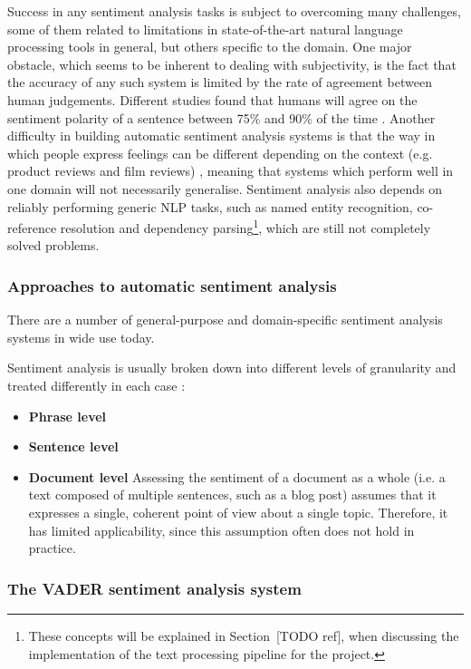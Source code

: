 \documentclass[bsc,frontabs,singlespacing,parskip, twoside]{infthesis}
\begin{document}
Success in any sentiment analysis tasks is subject to overcoming many challenges, some of them related to limitations in state-of-the-art natural language processing tools in general, but others specific to the domain. One major obstacle, which seems to be inherent to dealing with subjectivity, is the fact that the accuracy of any such system is limited by the rate of agreement between human judgements. Different studies found that humans will agree on the sentiment polarity of a sentence between 75\% and 90\% of the time \cite{godbole2007large, wilson2005recognizing}. Another difficulty in building automatic sentiment analysis systems is that the way in which people express feelings can be different depending on the context (e.g. product reviews and film reviews) \cite{varghesesurvey}, meaning that systems which perform well in one domain will not necessarily generalise. Sentiment analysis also depends on reliably performing generic NLP tasks, such as named entity recognition, co-reference resolution and dependency parsing\footnote{These concepts will be explained in Section~[TODO ref], when discussing the implementation of the text processing pipeline for the project.}, which are still not completely solved problems.

\subsubsection{Approaches to automatic sentiment analysis}

There are a number of general-purpose and domain-specific sentiment analysis systems in wide use today.

Sentiment analysis is usually broken down into different levels of granularity and treated differently in each case \cite{liu2012sentiment}:
\begin{itemize}
	\item \textbf{Phrase level}
	\item \textbf{Sentence level} 
	\item \textbf{Document level} Assessing the sentiment of a document as a whole (i.e. a text composed of multiple sentences, such as a blog post) assumes that it expresses a single, coherent point of view about a single topic. Therefore, it has limited applicability, since this assumption often does not hold in practice.
\end{itemize}

\subsubsection{The VADER sentiment analysis system}
\end{document}
